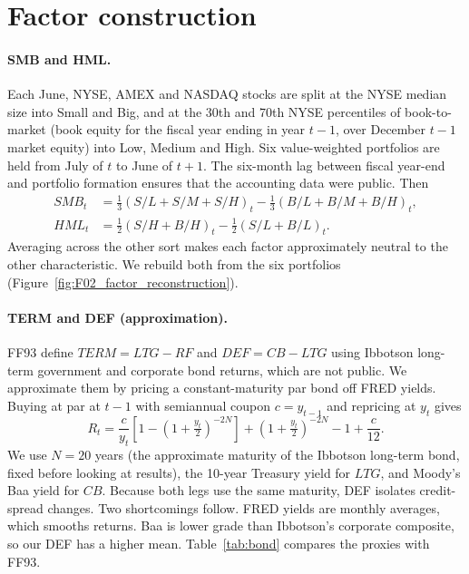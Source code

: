 \documentclass[11pt]{article}
\begin{document}
\section{Factor construction}

\paragraph{SMB and HML.} Each June, NYSE, AMEX and NASDAQ stocks are split at the NYSE median size into Small and Big, and at the 30th and 70th NYSE percentiles of book-to-market (book equity for the fiscal year ending in year $t-1$, over December $t-1$ market equity) into Low, Medium and High. Six value-weighted portfolios are held from July of $t$ to June of $t+1$. The six-month lag between fiscal year-end and portfolio formation ensures that the accounting data were public. Then
\begin{align}
SMB_t &= \tfrac13\left(S/L + S/M + S/H\right)_t - \tfrac13\left(B/L + B/M + B/H\right)_t, \\
HML_t &= \tfrac12\left(S/H + B/H\right)_t - \tfrac12\left(S/L + B/L\right)_t.
\end{align}
Averaging across the other sort makes each factor approximately neutral to the other characteristic. We rebuild both from the six portfolios (Figure~\ref{fig:F02_factor_reconstruction}).

\paragraph{TERM and DEF (approximation).} FF93 define $TERM = LTG - RF$ and $DEF = CB - LTG$ using Ibbotson long-term government and corporate bond returns, which are not public. We approximate them by pricing a constant-maturity par bond off FRED yields. Buying at par at $t-1$ with semiannual coupon $c=y_{t-1}$ and repricing at $y_t$ gives
\begin{equation}
R_t = \frac{c}{y_t}\left[1-\left(1+\tfrac{y_t}{2}\right)^{-2N}\right] + \left(1+\tfrac{y_t}{2}\right)^{-2N} - 1 + \frac{c}{12}.
\end{equation}
We use $N=20$ years (the approximate maturity of the Ibbotson long-term bond, fixed before looking at results), the 10-year Treasury yield for $LTG$, and Moody's Baa yield for $CB$. Because both legs use the same maturity, DEF isolates credit-spread changes. Two shortcomings follow. FRED yields are monthly averages, which smooths returns. Baa is lower grade than Ibbotson's corporate composite, so our DEF has a higher mean. Table~\ref{tab:bond} compares the proxies with FF93.
\end{document}
